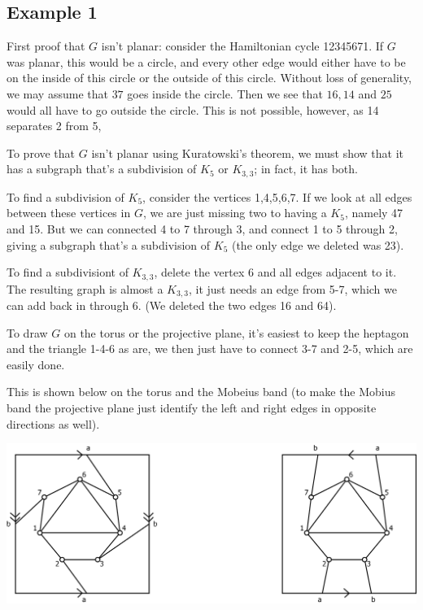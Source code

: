 \documentclass{amsart}
\begin{document}
\subsection{Example 1}

First proof that $G$ isn't planar: consider the Hamiltonian cycle 12345671.  If $G$ was planar, this would be a circle, and every other edge would either have to be on the inside of this circle or the outside of this circle.  Without loss of generality, we may assume that $37$ goes inside the circle.  Then we see that $16, 14$ and $25$ would all have to go outside the circle.  This is not possible, however, as 14 separates 2 from 5,

To prove that $G$ isn't planar using Kuratowski's theorem, we must show that it has a subgraph that's a subdivision of $K_5$ or $K_{3,3}$; in fact, it has both.

To find a subdivision of $K_5$, consider the vertices 1,4,5,6,7.  If we look at all edges between these vertices in $G$, we are just missing two to having a $K_5$, namely 47 and 15.   But we can connected 4 to 7 through 3, and connect 1 to 5 through 2, giving a subgraph that's a subdivision of $K_5$ (the only edge we deleted was 23).

To find a subdivisiont of $K_{3,3}$, delete the vertex 6 and all edges adjacent to it.  The resulting graph is almost a $K_{3,3}$, it just needs an edge from 5-7, which we can add back in through 6. (We deleted the two edges 16 and 64).

To draw $G$ on the torus or the projective plane, it's easiest to keep the heptagon and the triangle 1-4-6 as are, we then just have to connect 3-7 and 2-5, which are easily done.

This is shown below  on the torus and the Mobeius band (to make the Mobius band the projective plane just identify the left and right edges in opposite directions as well).

\begin{center}
\includegraphics[width=\textwidth]{torusstrip35new.png}
\end{center}
\end{document}
